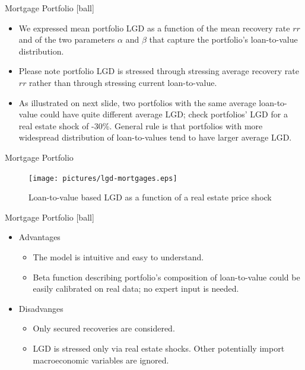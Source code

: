 \documentclass{beamer}
\begin{document}
\begin{frame}{Mortgage Portfolio}
[ball]
\begin{itemize}
	\item We expressed mean portfolio LGD as a function of the mean recovery rate $rr$ and of the two parameters $\alpha$ and $\beta$
	that capture the portfolio's loan-to-value distribution.
	\item Please note portfolio LGD is stressed through stressing average recovery rate $rr$ rather than through stressing current loan-to-value.
	\item As illustrated on next slide, two portfolios with the same average loan-to-value could have quite different average LGD; check portfolios' LGD for a real estate shock of -30\%.{}
	General rule is that portfolios with more widespread distribution of loan-to-values tend to have larger average LGD.
\end{itemize}
\end{frame}

\begin{frame}{Mortgage Portfolio}
\begin{figure}[htp]
\centering
\texttt{[image: pictures/lgd-mortgages.eps]}
\caption{Loan-to-value based LGD as a function of a real estate price shock}
\label{lgd-mortgages}
\end{figure}
\end{frame}

\begin{frame}{Mortgage Portfolio}
[ball]
\begin{itemize}
	\item Advantages
	\begin{itemize}
		\item The model is intuitive and easy to understand.
		\item Beta function describing portfolio's composition of loan-to-value could be easily calibrated on real data; no expert input is needed.
	\end{itemize}
	\item Disadvanges
		\begin{itemize}
			\item Only secured recoveries are considered.
			\item LGD is stressed only via real estate shocks. Other potentially import macroeconomic variables are ignored.
		\end{itemize}
\end{itemize}
\end{frame}
\end{document}
